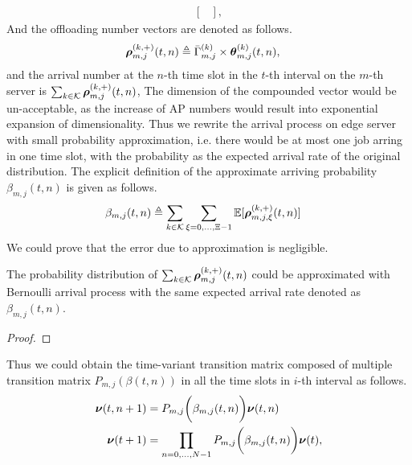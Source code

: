 {\begin{align}
\begin{bmatrix}
        \end{bmatrix},
    \end{align}
    And the offloading number vectors are denoted as follows.
    \begin{align}
        \boldsymbol{\rho}^{(k,+)}_{m,j}({t,n}) &\triangleq \bar{\Gamma}^{(k)}_{m,j} \times \boldsymbol{\theta}^{(k)}_{m,j}({t,n}),
    \end{align}
    and the arrival number at the $n$-th time slot in the $t$-th interval on the $m$-th server is $\sum_{k\in\mathcal{K}} \boldsymbol{\rho}^{(k,+)}_{m,j}({t,n})$,
    The dimension of the compounded vector would be un-acceptable, as the increase of AP numbers would result into exponential expansion of dimensionality.
    Thus we rewrite the arrival process on edge server with small probability approximation, i.e. there would be at most one job arring in one time slot, with the probability as the expected arrival rate of the original distribution. The explicit definition of the approximate arriving probability $\beta_{m,j}({t,n})$ is given as follows.
    \begin{align}
        {\beta}_{m,j}({t,n}) &\triangleq \sum_{k\in\mathcal{K}} \sum_{\xi=0,\dots,\Xi-1} \mathbb{E}[\boldsymbol{\rho}^{(k,+)}_{m,j,\xi}({t,n})]
        \label{eqn_0}
    \end{align}
    We could prove that the error due to approximation is negligible.
    \begin{lemma}
        The probability distribution of $\sum_{k\in\mathcal{K}} \boldsymbol{\rho}^{(k,+)}_{m,j}({t,n})$ could be approximated with Bernoulli arrival process with the same expected arrival rate denoted as ${\beta}_{m,j}({t,n})$.
    \end{lemma}
    \begin{proof}
    \end{proof}

    Thus we could obtain the time-variant transition matrix composed of multiple transition matrix $P_{m,j}(\beta({t,n}))$ in all the time slots in $i$-th interval as follows.
    \begin{align}
        \boldsymbol{\nu}({t,n+1}) &= P_{m,j}\bigg(\beta_{m,j}({t,n})\bigg) \boldsymbol{\nu}({t,n})
        \\
        \boldsymbol{\nu}({t+1}) &= \prod_{n=0,\dots,N-1} P_{m,j}\bigg(\beta_{m,j}({t,n})\bigg) \boldsymbol{\nu}(t),
        \label{eqn_4}
    \end{align}

}
